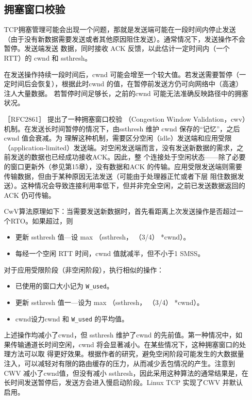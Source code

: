 \subsection{拥塞窗口校验}
TCP拥塞管理可能会出现一个问题，那就是发送端可能在一段时间内停止发送（由于没有新数据需要发送或者其他原因阻住发送）。通常情况下，发送操作不会暂停。发送端发送
数据，同时接收 ACK 反馈，以此估计一定时间内（一个 RTT）的 cwnd 和 ssthresh。

在发送操作持续一段时间后，cwnd 可能会增至一个较大值。若发送需要暂停（一定时间后会恢复），根据此时cwnd 的值，在暂停前发送方仍可向网络中（高速）注人大量数据。
若暂停时间足够长，之前的cwnd 可能无法准确反映路径中的拥塞状况。

［RFC2861］ 提出了一种拥塞窗口校验 （Congestion Window Validation，cwv）机制。在发送长时间暂停的情况下，由ssthresh 维护 cwnd 保存的“记忆”，之后cwnd 值会衰减。为
理解这种机制，需要区分空闲（idle）发送端和应用受限（application-limited）发送端。对空闲发送端而言，没有发送新数据的需求，之前发送的数据也已经成功接收ACK。因此，整
个连接处于空闲状态——除了必要的窗口更新外（参见第15章），没有数据和ACK 的传输。应用受限发送端则需要传输数据，但由于某种原因无法发送（可能由于处理器正忙或者下层
阻住数据发送）。这种情况会导致连接利用率低下，但并非完全空闲，之前已发送数据返回的ACK 仍可传输。

CwV算法原理如下：当需要发送新数据时，首先看距离上次发送操作是否超过一个RTO。如果超过，则

\begin{itemize}
    \item 更新 ssthresh 值—设 max （ssthresh， （3/4） *cwnd）。
    \item 每经一个空闲 RTT 时间，cwnd 值就减半，但不小于1 SMSS。
\end{itemize}
对于应用受限阶段（非空闲阶段），执行相似的操作：
\begin{itemize}
    \item 已使用的窗口大小记为 \verb|W_used|。
    \item 更新 ssthresh 值一—设为 max （ssthresh， （3/4） *cwnd）。
    \item cwnd设力cwnd 和 \verb|W_used| 的平均值。
\end{itemize}

上述操作均减小了cwnd，但 ssthresh 维护了cwnd 的先前值。第一种情况中，如果传输通道长时间空闲，cwnd 将会显著减小。在某些情况下，这种拥塞窗口的处理方法可以取
得更好效果。根据作者的研究，避免空闲阶段可能发生的大数据量注入，可以减轻对有限的路由缓存的压力，从而减少丢包情况的产生。注意到CWV 减小了cwnd值，但没有减小
ssthresh，因此采用这种算法的通常结果是，在长时间发送暂停后，发送方会进入慢启动阶段。Linux TCP 实现了CWV 并默认启用。

